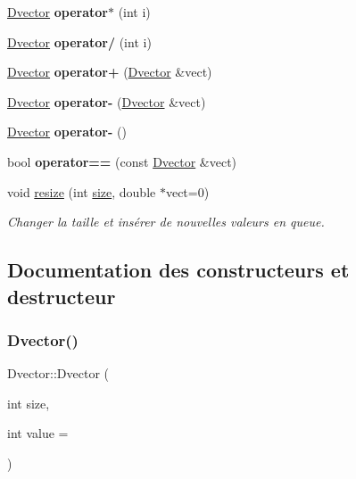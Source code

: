 \begin{DoxyCompactItemize}
\hyperlink{class_dvector}{Dvector} {\bfseries operator$\ast$} (int i)
\item 
\mbox{\label{class_dvector_a281d788b6a6c1c7b076684c20f63210f}} 
\hyperlink{class_dvector}{Dvector} {\bfseries operator/} (int i)
\item 
\mbox{\label{class_dvector_ad6d5934a4a49287611e35fc1bdd8d357}} 
\hyperlink{class_dvector}{Dvector} {\bfseries operator+} (\hyperlink{class_dvector}{Dvector} \&vect)
\item 
\mbox{\label{class_dvector_a27515c1928c6602c0b8b5a9c5a7dfffe}} 
\hyperlink{class_dvector}{Dvector} {\bfseries operator-\/} (\hyperlink{class_dvector}{Dvector} \&vect)
\item 
\mbox{\label{class_dvector_a402617afbca77199f537110a8efc0e10}} 
\hyperlink{class_dvector}{Dvector} {\bfseries operator-\/} ()
\item 
\mbox{\label{class_dvector_ae124565a643023393c191cc0acaa44b5}} 
bool {\bfseries operator==} (const \hyperlink{class_dvector}{Dvector} \&vect)
\item 
void \hyperlink{class_dvector_a3df83649e0ed9cf7c21fe03fdef8b2f4}{resize} (int \hyperlink{class_dvector_adda9654f389de24c744e897e93f850fb}{size}, double $\ast$vect=0)
\begin{DoxyCompactList}\small\item\em Changer la taille et insérer de nouvelles valeurs en queue. \end{DoxyCompactList}\end{DoxyCompactItemize}


\subsection{Documentation des constructeurs et destructeur}
\mbox{\label{class_dvector_a8a4feb509178ccc26a7d3805548fab17}} 
\subsubsection{\texorpdfstring{Dvector()}{Dvector()}\hspace{0.1cm}{\footnotesize\ttfamily [1/2]}}
{\footnotesize\ttfamily Dvector\+::\+Dvector (\begin{DoxyParamCaption}\item[{int}]{size,  }\item[{int}]{value = {} }\end{DoxyParamCaption})}

